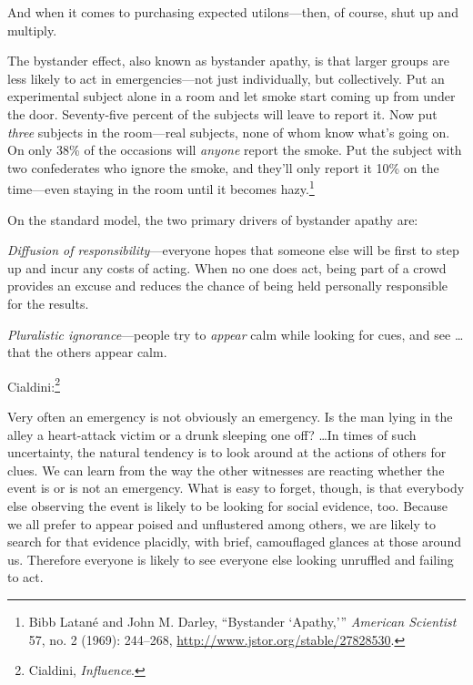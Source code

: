 {
 And when it comes to purchasing expected utilons---then, of
course, shut up and multiply.}

\myendsectiontext


{
 The bystander effect, also known as bystander apathy, is that
larger groups are less likely to act in emergencies---not just
individually, but collectively. Put an experimental subject alone in a
room and let smoke start coming up from under the door. Seventy-five
percent of the subjects will leave to report it. Now put \textit{three}
subjects in the room---real subjects, none of whom know
what's going on. On only 38\% of the occasions will
\textit{anyone} report the smoke. Put the subject with two confederates
who ignore the smoke, and they'll only report it 10\%
on the time---even staying in the room until it becomes
hazy.\footnote{Bibb Latané and John M. Darley, ``Bystander
`Apathy,'''
\textit{American Scientist} 57, no. 2 (1969): 244--268,
\url{http://www.jstor.org/stable/27828530}.} }

{
 On the standard model, the two primary drivers of bystander apathy
are:}

{
 \textit{Diffusion of responsibility}{}---everyone hopes that
someone else will be first to step up and incur any costs of acting.
When no one does act, being part of a crowd provides an excuse and
reduces the chance of being held personally responsible for the
results.}

{
 \textit{Pluralistic ignorance}{}---people try to \textit{appear}
calm while looking for cues, and see \ldots that the others appear
calm.}

{
 Cialdini:\footnote{Cialdini, \textit{Influence}.}}

{
 Very often an emergency is not obviously an emergency. Is the man
lying in the alley a heart-attack victim or a drunk sleeping one off?
\ldots In times of such uncertainty, the natural tendency is to look
around at the actions of others for clues. We can learn from the way
the other witnesses are reacting whether the event is or is not an
emergency. What is easy to forget, though, is that everybody else
observing the event is likely to be looking for social evidence, too.
Because we all prefer to appear poised and unflustered among others, we
are likely to search for that evidence placidly, with brief,
camouflaged glances at those around us. Therefore everyone is likely to
see everyone else looking unruffled and failing to act.}

